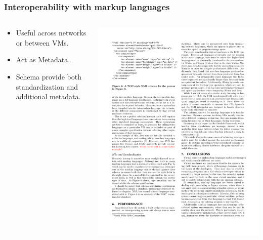 \documentclass{beamer}
\begin{document}
 \begin{frame}
  \frametitle{Interoperability with markup languages}
  \begin{columns}
  \begin{column}{0.5\textwidth}
  \begin{itemize}
  \item Useful across networks or between VMs.
  \item Act as Metadata.
  \item Schema provide both standardization and additional metadata.
  \end{itemize}
  \end{column}
  
  \begin{column}{0.5\textwidth}  
  \includegraphics[scale=0.8]{graphics/XMLSchemaW3C.pdf}
  \end{column}
  \end{columns}
 \end{frame}
\end{document}
